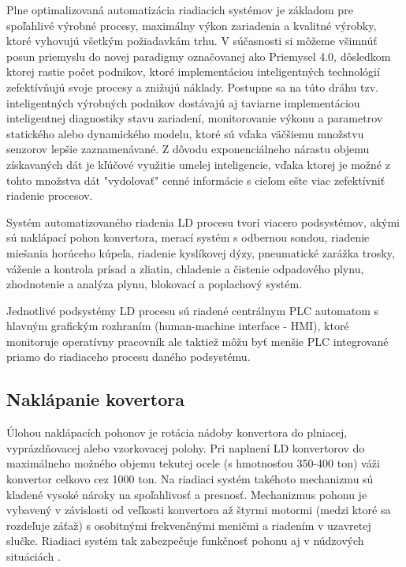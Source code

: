 \documentclass[]{tukediphc}
\begin{document}
Plne optimalizovaná automatizácia riadiacich systémov je základom pre spoľahlivé výrobné procesy, maximálny výkon zariadenia a kvalitné výrobky, ktoré vyhovujú všetkým požiadavkám trhu. V súčasnosti si môžeme všimnúť posun priemyslu do novej paradigmy označovanej ako Priemysel 4.0, dôsledkom ktorej rastie počet podnikov, ktoré implementáciou inteligentných technológií zefektívňujú svoje procesy a znižujú náklady. Postupne sa na túto dráhu tzv. inteligentných výrobných podnikov dostávajú aj taviarne implementáciou inteligentnej diagnostiky stavu zariadení, monitorovanie výkonu a parametrov statického alebo dynamického modelu, ktoré sú vďaka väčšiemu množstvu senzorov lepšie zaznamenávané. Z dôvodu exponenciálneho nárastu objemu získavaných dát je kľúčové využitie umelej inteligencie, vďaka ktorej je možné z tohto množstva dát "vydolovať" cenné informácie s cieľom ešte viac zefektívniť riadenie procesov.

Systém automatizovaného riadenia LD procesu tvorí viacero podsystémov, akými sú naklápací pohon konvertora, merací systém s odbernou sondou, riadenie miešania horúceho kúpeľa, riadenie kyslíkovej dýzy, pneumatické zarážka trosky, váženie a kontrola prísad a zliatin, chladenie a čistenie odpadového plynu, zhodnotenie a analýza plynu, blokovací a poplachový systém. 

Jednotlivé podsystémy LD procesu sú riadené centrálnym PLC automatom s hlavným grafickým rozhraním (human-machine interface - HMI), ktoré monitoruje operatívny pracovník ale taktiež môžu byť menšie PLC integrované priamo do riadiaceho procesu daného podsystému.

\subsection{Naklápanie kovertora}

Úlohou naklápacích pohonov je rotácia nádoby konvertora do plniacej, vyprázdňovacej alebo vzorkovacej polohy. Pri naplnení LD konvertorov do maximálneho možného objemu tekutej ocele (s hmotnosťou 350-400 ton) váži konvertor celkovo cez 1000 ton. Na riadiaci systém takéhoto mechanizmu sú kladené vysoké nároky na spoľahlivosť a presnosť. Mechanizmus pohonu je vybavený v závislosti od veľkosti konvertora až štyrmi motormi (medzi ktoré sa rozdeľuje záťaž) s osobitnými frekvenčnými meničmi a riadením v uzavretej slučke. Riadiaci systém tak zabezpečuje funkčnosť pohonu aj v núdzových situáciách \citep{smsgroup}. 
\end{document}
